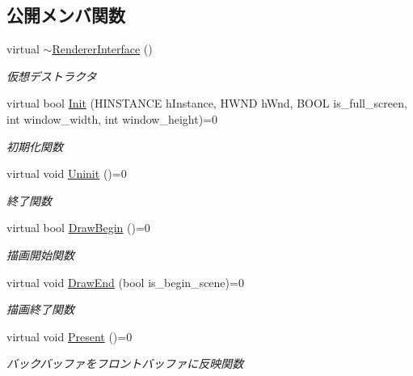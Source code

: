 \subsection*{公開メンバ関数}
\begin{DoxyCompactItemize}
\item 
virtual \mbox{\hyperlink{class_renderer_interface_a1dfa67d2c714f8c66759ab677569a750}{$\sim$\+Renderer\+Interface}} ()
\begin{DoxyCompactList}\small\item\em 仮想デストラクタ \end{DoxyCompactList}\item 
virtual bool \mbox{\hyperlink{class_renderer_interface_aabef76c27c2332c1af2dbcf7e8de5d38}{Init}} (H\+I\+N\+S\+T\+A\+N\+CE h\+Instance, H\+W\+ND h\+Wnd, B\+O\+OL is\+\_\+full\+\_\+screen, int window\+\_\+width, int window\+\_\+height)=0
\begin{DoxyCompactList}\small\item\em 初期化関数 \end{DoxyCompactList}\item 
virtual void \mbox{\hyperlink{class_renderer_interface_ada105489f9db98e7e9542b278699d558}{Uninit}} ()=0
\begin{DoxyCompactList}\small\item\em 終了関数 \end{DoxyCompactList}\item 
virtual bool \mbox{\hyperlink{class_renderer_interface_a86a487deb4e4207a67410d00ec670fd7}{Draw\+Begin}} ()=0
\begin{DoxyCompactList}\small\item\em 描画開始関数 \end{DoxyCompactList}\item 
virtual void \mbox{\hyperlink{class_renderer_interface_a0034a44420e4746062e70e4d66d3bee2}{Draw\+End}} (bool is\+\_\+begin\+\_\+scene)=0
\begin{DoxyCompactList}\small\item\em 描画終了関数 \end{DoxyCompactList}\item 
virtual void \mbox{\hyperlink{class_renderer_interface_aa9e12d2a2f5ffa351c457cfc7806b6f1}{Present}} ()=0
\begin{DoxyCompactList}\small\item\em バックバッファをフロントバッファに反映関数 \end{DoxyCompactList}\end{DoxyCompactItemize}


